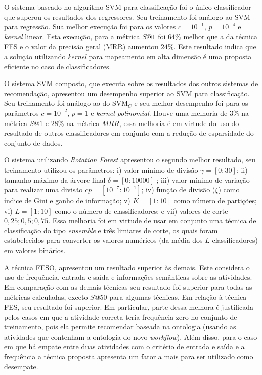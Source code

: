 \documentclass[10pt,letterpaper]{article}
\begin{document}
O sistema baseado no algoritmo SVM para classificação foi o único classificador que superou os resultados dos regressores. Seu treinamento foi análogo ao SVM para regressão. Sua melhor execução foi para os valores \(c = 10^{-1}\), \(p = 10^{-4}\) e \emph{kernel} linear. Esta execução, para a métrica \(S@1\) foi \(64\%\) melhor que a da técnica FES e o valor da precisão geral (MRR) aumentou \(24\%\). Este resultado indica que a solução utilizando \emph{kernel} para mapeamento em alta dimensão é uma proposta eficiente no caso de classificadores.

O sistema SVM composto, que executa sobre os resultados dos outros sistemas de recomendação, apresentou um desempenho superior ao SVM para classificação. Seu treinamento foi análogo ao do SVM\(_{C}\) e seu melhor desempenho foi para os parâmetros \(c = 10^{-2}\), \(p = 1\) e \emph{kernel polinomial}. Houve uma melhoria de \(3\%\) na métrica \(S@1\) e \(28\%\) na métrica \(MRR\), essa melhoria é em virtude do uso do resultado de outros classificadores em conjunto com a redução de esparsidade do conjunto de dados.

O sistema utilizando \emph{Rotation Forest} apresentou o segundo melhor resultado, seu treinamento utilizou os parâmetros: i) valor mínimo de divisão \(\gamma = [0:30]\); ii) tamanho máximo da árvore final \(\delta = [0:10000]\) ; iii) valor mínimo de variação para realizar uma divisão \(cp = [10^{-7}:10^{+1}]\); iv) função de divisão (\(\xi\)) como índice de Gini e ganho de informação; v) \(K = [1:10]\) como número de partições; vi) \(L = [1:10]\) como o número de classificadores; e vii) valores de corte \(0,25; 0,5; 0,75\). Essa melhoria foi em virtude de usar em conjunto uma técnica de classificação do tipo \emph{ensemble} e três limiares de corte, os quais foram estabelecidos para converter os valores numéricos (da média dos \(L\) classificadores) em valores binários.

A técnica FESO, apresentou um resultado superior às demais. Este  considera o uso de frequência, entrada e saída e informações semânticas sobre as atividades. Em comparação com as demais técnicas seu resultado foi superior para todas as métricas calculadas, exceto \(S@50\) para algumas técnicas. Em relação à técnica FES, seu resultado foi superior. Em particular, parte dessa melhora é justificada pelos casos em que a atividade correta teria frequência zero no conjunto de treinamento, pois ela permite recomendar baseada na ontologia (usando as atividades que contenham a ontologia do novo \emph{workflow}). Além disso, para o caso em que há empate entre duas atividades com o critério de entrada e saída e a frequência a técnica proposta apresenta um fator a mais para ser utilizado como desempate.
\end{document}
